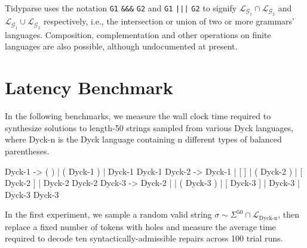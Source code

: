 \documentclass[sigplan,review,anonymous,acmsmall]{acmart}\settopmatter{printfolios=false,printccs=false,printacmref=false}
\begin{document}
\noindent Tidyparse uses the notation \texttt{G1} {\color{blue}\texttt{\&\&\&}} \texttt{G2} and \texttt{G1} {\color{blue}\texttt{|||}} \texttt{G2} to signify $\mathcal{L}_{\mathcal{G}_1}\cap\mathcal{L}_{\mathcal{G}_2}$ and $\mathcal{L}_{\mathcal{G}_1}\cup\mathcal{L}_{\mathcal{G}_2}$ respectively, i.e., the intersection or union of two or more grammars' languages. {Composition}, complementation and other operations on finite languages are also possible, although undocumented at present.

%

\section{Latency Benchmark}\label{sec:latency}

In the following benchmarks, we measure the wall clock time required to synthesize solutions to length-50 strings sampled from various Dyck languages, where Dyck-n is the Dyck language containing n different types of balanced parentheses.

\begin{wholetidyinput}
Dyck-1 -> ( ) | ( Dyck-1 ) | Dyck-1 Dyck-1
Dyck-2 -> Dyck-1 | [ ] | ( Dyck-2 ) | [ Dyck-2 ] | Dyck-2 Dyck-2
Dyck-3 -> Dyck-2 | { } | ( Dyck-3 ) | [ Dyck-3 ] | { Dyck-3 } | Dyck-3 Dyck-3
\end{wholetidyinput}

\noindent In the first experiment, we sample a random valid string $\sigma \sim \Sigma^{50} \cap \mathcal{L}_{\text{Dyck-n}}$, then replace a fixed number of tokens with holes and measure the average time required to decode ten syntactically-admissible repairs across 100 trial runs.
\end{document}
